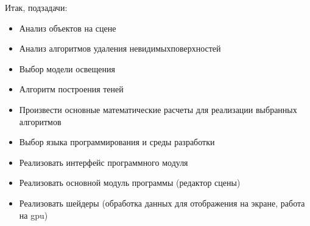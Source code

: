 

Итак, подзадачи:

\begin{itemize}
    \setlength{\itemsep}{0em}
    \item Анализ объектов на сцене
    \item Анализ алгоритмов удаления невидимыхповерхностей
    \item Выбор модели освещения
    \item Алгоритм построения теней
    \item Произвести основные математические расчеты для реализации выбранных алгоритмов
    \item Выбор языка программирования и среды разработки
    \item Реализовать интерфейс программного модуля
    \item Реализовать основной модуль программы (редактор сцены)
    \item Реализовать шейдеры (обработка данных для отображения на экране, работа на gpu)
\end{itemize}
